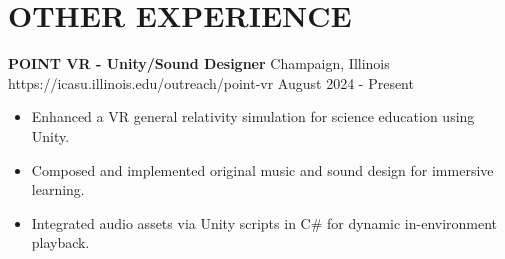 \documentclass[a4paper,12pt]{extarticle}
\begin{document}
\section*{OTHER EXPERIENCE}

\noindent
\textbf{POINT VR - Unity/Sound Designer} \hspace{0.05cm}
\hfill Champaign, Illinois\\ %
https://icasu.illinois.edu/outreach/point-vr
\hfill August 2024 - Present %
\begin{itemize}[topsep=0pt]
\itemindent=-13pt
\item Enhanced a VR general relativity simulation for science education using Unity.
\item Composed and implemented original music and sound design for immersive learning.
\item Integrated audio assets via Unity scripts in C\# for dynamic in-environment playback.
\end{itemize}







\end{document}
